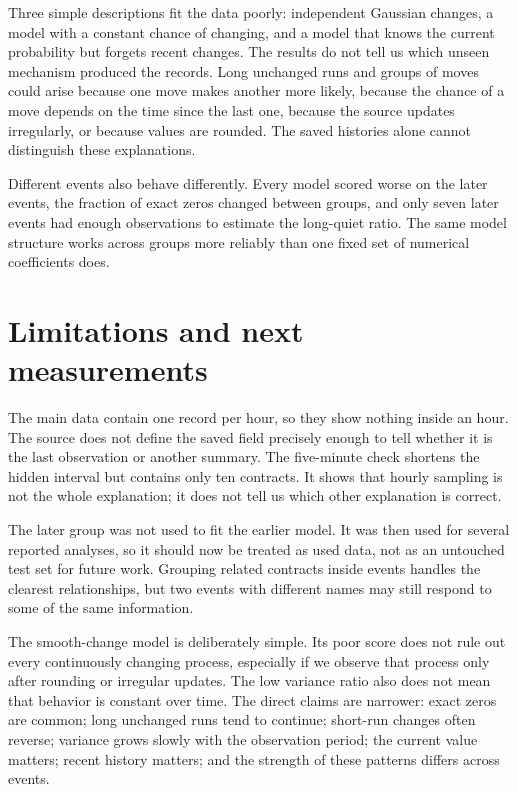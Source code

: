 \documentclass[10pt,twoside]{article}
\begin{document}
Three simple descriptions fit the data poorly: independent Gaussian changes, a model with a constant chance of changing, and a model that knows the current probability but forgets recent changes. The results do not tell us which unseen mechanism produced the records. Long unchanged runs and groups of moves could arise because one move makes another more likely, because the chance of a move depends on the time since the last one, because the source updates irregularly, or because values are rounded. The saved histories alone cannot distinguish these explanations.

Different events also behave differently. Every model scored worse on the later events, the fraction of exact zeros changed between groups, and only seven later events had enough observations to estimate the long-quiet ratio. The same model structure works across groups more reliably than one fixed set of numerical coefficients does.

\section{Limitations and next measurements}

The main data contain one record per hour, so they show nothing inside an hour. The source does not define the saved field precisely enough to tell whether it is the last observation or another summary. The five-minute check shortens the hidden interval but contains only ten contracts. It shows that hourly sampling is not the whole explanation; it does not tell us which other explanation is correct.

The later group was not used to fit the earlier model. It was then used for several reported analyses, so it should now be treated as used data, not as an untouched test set for future work. Grouping related contracts inside events handles the clearest relationships, but two events with different names may still respond to some of the same information.

The smooth-change model is deliberately simple. Its poor score does not rule out every continuously changing process, especially if we observe that process only after rounding or irregular updates. The low variance ratio also does not mean that behavior is constant over time. The direct claims are narrower: exact zeros are common; long unchanged runs tend to continue; short-run changes often reverse; variance grows slowly with the observation period; the current value matters; recent history matters; and the strength of these patterns differs across events.
\end{document}
